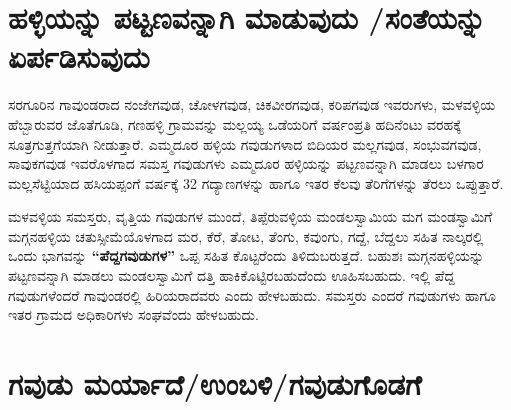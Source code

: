 \section*{ಹಳ್ಳಿಯನ್ನು ಪಟ್ಟಣವನ್ನಾಗಿ ಮಾಡುವುದು /ಸಂತೆಯನ್ನು ಏರ್ಪಡಿಸುವುದು}

\vskip 2pt

ಸರಗೂರಿನ ಗಾವುಂಡರಾದ ನಂಜೇಗವುಡ, ಚೋಳಗವುಡ, ಚಿಕವೀರಗವುಡ, ಕರಿಪಗವುಡ ಇವರುಗಳು, ಮಳವಳ್ಳಿಯ ಹೆಬ್ಬಾರುವರ ಜೊತೆಗೂಡಿ, ಗಣಹಳ್ಳಿ ಗ್ರಾಮವನ್ನು ಮಲ್ಲಯ್ಯ ಒಡೆಯರಿಗೆ ವರ್ಷಂಪ್ರತಿ ಹದಿನೆಂಟು ವರಹಕ್ಕೆ ಸೂತ್ರಗುತ್ತಗೆ\-ಯಾಗಿ ನೀಡುತ್ತಾರೆ. ಎಮ್ಮದೂರ ಹಳ್ಳಿಯ ಗವುಡುಗಳಾದ ಬಿದಿಯರ ಮಲ್ಲಗವುಡ, ಸಂಭುವಗವುಡ, ಸಾವುಕಗವುಡ ಇವರೊಳಗಾದ ಸಮಸ್ತ ಗವುಡುಗಳು ಎಮ್ಮದೂರ ಹಳ್ಳಿಯನ್ನು ಪಟ್ಟಣವನ್ನಾಗಿ ಮಾಡಲು ಬಳಗಾರ ಮಲ್ಲಸೆಟ್ಟಿಯಾದ ಹಸಿಯಪ್ಪಂಗೆ ವರ್ಷಕ್ಕೆ 32 ಗದ್ಯಾಣಗಳನ್ನು ಹಾಗೂ ಇತರ ಕೆಲವು ತೆರಿಗೆಗಳನ್ನು ತೆರಲು ಒಪ್ಪುತ್ತಾರೆ.

\vskip 2pt

ಮಳವಳ್ಳಿಯ ಸಮಸ್ತರು, ವೃತ್ತಿಯ ಗವುಡುಗಳ ಮುಂದೆ, ತಿಪ್ಪೆರುವಳ್ಳಿಯ ಮಂಡಲಸ್ವಾಮಿಯ ಮಗ ಮಂಡಸ್ವಾಮಿಗೆ ಮಗ್ಗನಹಳ್ಳಿಯ ಚತುಸ್ಸೀಮೆಯೊಳಗಾದ ಮರ, ಕೆರೆ, ತೋಟ, ತೆಂಗು, ಕವುಂಗು, ಗದ್ದೆ, ಬೆದ್ದಲು ಸಹಿತ ನಾಲ್ಕರಲ್ಲಿ ಒಂದು ಭಾಗವನ್ನು \textbf{“ಪೆದ್ದಗವುಡುಗಳ”} ಒಪ್ಪ ಸಹಿತ ಕೊಟ್ಟರೆಂದು ತಿಳಿದುಬರುತ್ತದೆ. ಬಹುಶಃ ಮಗ್ಗನಹಳ್ಳಿಯನ್ನು ಪಟ್ಟಣವನ್ನಾಗಿ ಮಾಡಲು ಮಂಡಲಸ್ವಾಮಿಗೆ ದತ್ತಿ ಹಾಕಿಕೊಟ್ಟಿರಬಹುದೆಂದು ಊಹಿಸಬಹುದು. ಇಲ್ಲಿ ಪೆದ್ದ ಗವುಡುಗಳೆಂದರೆ ಗಾವುಂಡರಲ್ಲಿ ಹಿರಿಯರಾದವರು ಎಂದು ಹೇಳಬಹುದು. ಸಮಸ್ತರು ಎಂದರೆ ಗವುಡುಗಳು ಹಾಗೂ ಇತರ ಗ್ರಾಮದ ಅಧಿಕಾರಿಗಳು ಸಂಘ\-ವೆಂದು ಹೇಳಬಹುದು.


\section*{ಗವುಡು ಮರ್ಯಾದೆ/ಉಂಬಳಿ/ಗವುಡುಗೊಡಗೆ}

